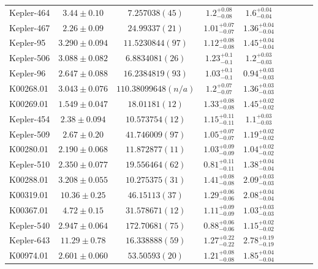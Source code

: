 \documentclass[a4paper,fleqn,usenatbib]{mnras}
\begin{document}
\begin{table*}
\begin{tabular}{lcccccccc}

Kepler-464&	$3.44 \pm 0.10$ 	&$ 7.257038 (45)$      	&$1.2^{+0.08}_{-0.08}$	&$1.6^{+0.04}_{-0.04}$	&\\
Kepler-467&	$2.26 \pm 0.09$ 	&$24.99337 (21)$       	&$1.01^{+0.07}_{-0.07}$	&$1.36^{+0.04}_{-0.04}$	&\\
Kepler-95&	$3.290 \pm 0.094$	&$11.5230844 (97)$     	&$1.12^{+0.08}_{-0.08}$	&$1.45^{+0.04}_{-0.04}$	&\\
Kepler-506&	$3.088 \pm 0.082$	&$ 6.8834081 (26)$    	&$1.23^{+0.1}_{-0.1}$	&$1.2^{+0.03}_{-0.03}$	&\\
Kepler-96&	$2.647 \pm 0.088$	&$16.2384819 (93)$     	&$1.03^{+0.1}_{-0.1}$	&$0.94^{+0.03}_{-0.03}$	&\\
K00268.01&	$3.043 \pm 0.076$  &$110.38099648 (n/a)$	&$1.2^{+0.07}_{-0.07}$	&$1.36^{+0.03}_{-0.03}$	&\\
K00269.01&	$1.549 \pm 0.047$	&$18.01181 (12)$       	&$1.33^{+0.08}_{-0.08}$	&$1.45^{+0.02}_{-0.02}$	&\\
Kepler-454&	$2.38 \pm 0.094$	&$10.573754 (12)$   	&$1.15^{+0.11}_{-0.11}$	&$1.1^{+0.03}_{-0.03}$	&\\
Kepler-509&	$2.67 \pm 0.20$ 	&$41.746009 (97) $     	&$1.05^{+0.07}_{-0.07}$	&$1.19^{+0.02}_{-0.02}$	&\\
K00280.01&	$2.190 \pm 0.068$	&$11.872877 (11)$      	&$1.03^{+0.09}_{-0.09}$	&$1.04^{+0.02}_{-0.02}$	&\\
Kepler-510&	$2.350 \pm 0.077$	&$19.556464 (62)$     	&$0.81^{+0.11}_{-0.11}$	&$1.38^{+0.04}_{-0.04}$	&\\
K00288.01&	$3.208 \pm 0.055$	&$10.275375 (31)$      	&$1.41^{+0.08}_{-0.08}$	&$2.09^{+0.03}_{-0.03}$	&\\
K00319.01&	$10.36 \pm 0.25$	&$46.15113 (37)$    	&$1.29^{+0.06}_{-0.06}$	&$2.08^{+0.04}_{-0.04}$	&\\
K00367.01&	$4.72 \pm 0.15$  	&$31.578671 (12)$      	&$1.11^{+0.09}_{-0.09}$	&$1.03^{+0.03}_{-0.03}$	&\\
Kepler-540&	$2.947 \pm 0.064$  &$172.70681 (75)$    	&$0.88^{+0.06}_{-0.06}$	&$1.15^{+0.02}_{-0.02}$	&\\
Kepler-643&	$11.29 \pm 0.78$	&$16.338888 (59)$  	    &$1.27^{+0.22}_{-0.22}$	&$2.78^{+0.19}_{-0.19}$	&\\
K00974.01&	$2.601 \pm 0.060$	&$53.50593 (20) $      	&$1.21^{+0.08}_{-0.08}$	&$1.85^{+0.04}_{-0.04}$	&\\

\end{tabular}
\end{table*}
\end{document}
